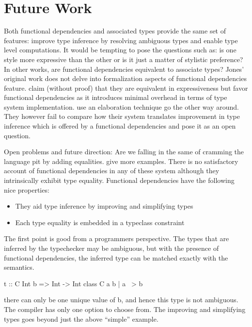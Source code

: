 \documentclass[screen,nonacm]{acmart}
\begin{document}
\section{Future Work}\label{sec:future-work}
Both functional dependencies and associated types provide the same set
of features: improve type inference by resolving ambiguous types and
enable type level computations. It would be tempting to pose the
questions such as: is one style more expressive than the other or is
it just a matter of stylistic preference? In other works, are
functional dependencies equivalent to associate types? Jones' original
work does not delve into formalization aspects of functional
dependencies feature. \citet{jones_language_2008} claim (without
proof) that they  are equivalent in expressiveness but favor
functional dependencies as it introduces minimal overhead in terms of
type system implementation. \citet{karachalias_elaboration_2017} use
an elaboration technique go the other way around. They however fail to
compare how their system translates improvement in type inference
which is offered by a functional dependencies and pose it as an open question.

Open problems and future direction: Are we falling in the same of
cramming the language pit by adding equalities. give more examples.
There is no satisfactory account of functional
dependencies in any of these system although they intrinsically exhibit
type equality. Functional dependencies have the following nice
properties\cite{jones_simplifying_1995}:
\begin{itemize}
\item They aid type inference by improving and simplifying types
\item Each type equality is embedded in a typeclass constraint
\end{itemize}

The first point is good from a programmers perspective. The types that
are inferred by the typechecker may be ambiguous, but with the presence of
functional dependencies, the inferred type can be matched exactly with
the semantics.

\begin{code}
  t :: C Int b => Int -> Int
  class C a b | a ~> b
\end{code}

there can only be one unique value of b, and hence this type is not
ambiguous. The compiler has only one option to choose from.
The improving and simplifying types goes beyond just the above
``simple'' example.
\end{document}
